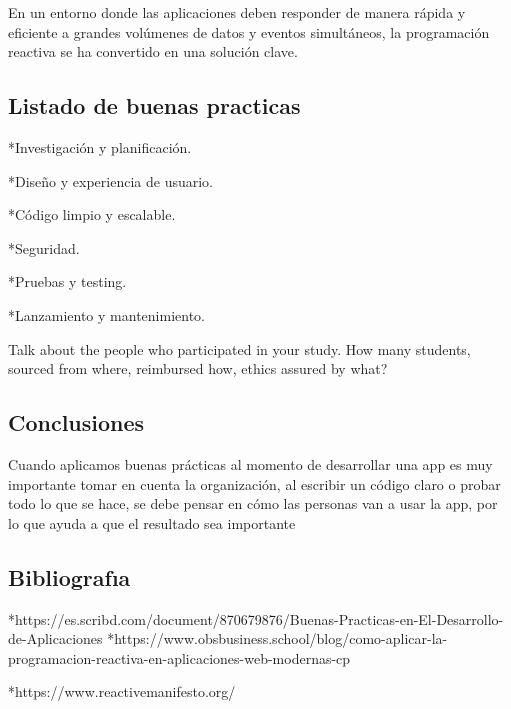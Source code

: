 \documentclass[stu,12pt,floatsintext]{apa7}
\begin{document}
En un entorno donde las aplicaciones deben responder de manera rápida y eficiente a grandes volúmenes de datos y eventos simultáneos, la programación reactiva se ha convertido en una solución clave.

\subsection{Listado de buenas practicas}

*Investigación y planificación.

*Diseño y experiencia de usuario.

*Código limpio y escalable.

*Seguridad.

*Pruebas y testing.

*Lanzamiento y mantenimiento.

Talk about the people who participated in your study. How many students, sourced from where, reimbursed how, ethics assured by what?

\subsection{Conclusiones}

Cuando aplicamos buenas prácticas al momento de desarrollar una app es muy importante tomar en cuenta la organización, al escribir un código claro o probar todo lo que se hace, se debe pensar en cómo las personas van a usar la app, por lo que ayuda a que el resultado sea importante
\subsection{Bibliografıa}

*https://es.scribd.com/document/870679876/Buenas-Practicas-en-El-Desarrollo-de-Aplicaciones
*https://www.obsbusiness.school/blog/como-aplicar-la-programacion-reactiva-en-aplicaciones-web-modernas-cp

*https://www.reactivemanifesto.org/








\printbibliography
\end{document}
